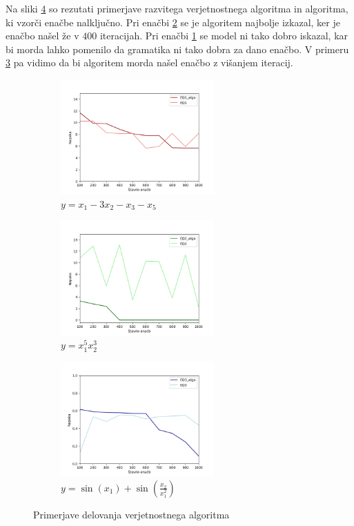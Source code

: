 \documentclass[12pt]{article}
\begin{document}
Na sliki \ref*{rezultati} so rezutati primerjave razvitega verjetnostnega algoritma in 
algoritma, ki vzorči enačbe nalključno. Pri enačbi 
\ref*{fig:subim2} se je algoritem najbolje izkazal, ker je enačbo našel že v $400$ iteracijah. 
Pri enačbi \ref*{fig:subim1} se model ni tako dobro iskazal, kar bi morda lahko pomenilo 
da gramatika ni tako dobra za dano enačbo. V primeru \ref*{fig:subim3} pa vidimo 
da bi algoritem morda našel enačbo z višanjem iteracij.
\begin{figure}[h!] %
    \begin{subfigure}{0.32\textwidth}
        \includegraphics[width=\linewidth,  height=4.4cm]{Fig/eq1.png}
        \caption{$y = x_1 - 3x_2 - x_3 - x_5$}
        \label{fig:subim1}
    \end{subfigure}
 \hfill %
    \begin{subfigure}{0.32\textwidth}
        \includegraphics[width=\linewidth,  height=4.4cm]{Fig/eq2.png}
        \caption{$y = x_1^5x_2^3$}
        \label{fig:subim2}
    \end{subfigure}
 \hfill %
    \begin{subfigure}{0.32\textwidth}
        \includegraphics[width=\linewidth,  height=4.4cm]{Fig/eq3.png}
        \caption{$y = \sin(x_1) + \sin(\frac{x_2}{x_1^2})$}
        \label{fig:subim3}
    \end{subfigure}
 
    \caption{Primerjave delovanja verjetnostnega algoritma}
    \label{rezultati}
 \end{figure}
\end{document}
